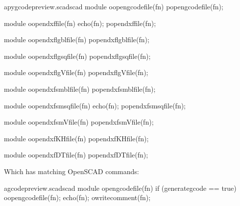 \documentclass{ltxdoc}
\begin{document}
\lstset{firstnumber=\thepyscad}
\begin{writecode}{a}{pygcodepreview.scad}{scad}
module oopengcodefile(fn) {
	popengcodefile(fn);
}

module oopendxffile(fn) {
    echo(fn);
	popendxffile(fn);
}

module oopendxflgblfile(fn) {
	popendxflgblfile(fn);
}

module oopendxflgsqfile(fn) {
	popendxflgsqfile(fn);
}

module oopendxflgVfile(fn) {
	popendxflgVfile(fn);
}

module oopendxfsmblfile(fn) {
	popendxfsmblfile(fn);
}

module oopendxfsmsqfile(fn) {
    echo(fn);
	popendxfsmsqfile(fn);
}

module oopendxfsmVfile(fn) {
	popendxfsmVfile(fn);
}

module oopendxfKHfile(fn) {
	popendxfKHfile(fn);
}

module oopendxfDTfile(fn) {
	popendxfDTfile(fn);
}

\end{writecode}
\addtocounter{pyscad}{42}



Which has matching OpenSCAD commands:
 
\lstset{firstnumber=\thegcpscad}
\begin{writecode}{a}{gcodepreview.scad}{scad}
module opengcodefile(fn) {
if (generategcode == true) {
	oopengcodefile(fn);
    echo(fn);
    owritecomment(fn);
    }
}

\end{writecode}
\addtocounter{gcpscad}{8}
\end{document}
